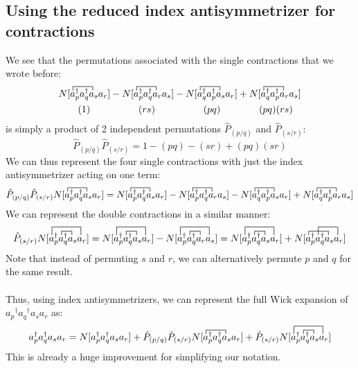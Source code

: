 \documentclass{article}
\newcommand{\fctr}{\contraction}
\newcommand{\dg}{\ensuremath{^\dagger} }
\begin{document}
 \subsection{Using the reduced index antisymmetrizer for contractions}
 We see that the permutations associated with the single contractions that we wrote before: 
 \begin{align*}
 & N[ \fctr{}{x}{{}_1a_q\dg }{x} a_p\dg  a_q\dg a_s a_r  ] - N[ \fctr{}{x}{{}_1a_q\dg  }{x} a_p\dg a_q\dg a_r  a_s  ] 
- N[ \fctr{ }{x}{{}_q\dg a_p\dg }{x} a_q\dg  a_p\dg a_s a_r  ] +  N[ \fctr{ }{x}{{}_q\dg a_p\dg }{x} a_q\dg a_p\dg  a_r a_s   ] \\ 
& \quad \quad (1)  \quad \quad  \quad \quad \quad (rs) \quad \quad  \quad \quad \quad (pq) \quad \quad  \quad \quad (pq)(rs) 
\end{align*}
is simply a product of 2 independent permutations $\hat{P}_{(p/q)}$ and $\hat{P}_{(s/r)}$:
\[ \hat{P}_{(p/q)}\hat{P}_{(s/r)} = 1 - (pq) - (sr) + (pq)(sr) \]
We can thus represent the four single contractions with just the index antisymmetrizer acting on one term: 
\[ \hat{P}_{(p/q)}\hat{P}_{(s/r)} N[ \fctr{}{x}{{}_1a_q\dg }{x} a_p\dg  a_q\dg a_s a_r  ]  = N[ \fctr{}{x}{{}_1a_q\dg }{x} a_p\dg  a_q\dg a_s a_r  ] - N[ \fctr{}{x}{{}_1a_q\dg  }{x} a_p\dg a_q\dg a_r  a_s  ] 
- N[ \fctr{ }{x}{{}_q\dg a_p\dg }{x} a_q\dg  a_p\dg a_s a_r  ] +  N[ \fctr{ }{x}{{}_q\dg a_p\dg }{x} a_q\dg a_p\dg  a_r a_s   ]  \] 
We can represent the double contractions in a similar manner: 
\[ \hat{P}_{(s/r)}  N[ \fctr{a_p\dg }{x}{{}_2}{x} \fctr[2ex]{}{x}{{}_1a_q\dg  a_s }{x}      a_p\dg a_q\dg a_s a_r  ]  =  N[ \fctr{a_p\dg }{x}{{}_2}{x} \fctr[2ex]{}{x}{{}_1a_q\dg  a_s }{x}      a_p\dg a_q\dg a_s a_r  ] 
 - N[ \fctr{a_p\dg }{x}{{}_2}{x} \fctr[2ex]{}{x}{{}_1a_q\dg  a_s }{x}      a_p\dg a_q\dg a_r a_s  ] = N[ \fctr{a_p\dg }{x}{{}_2}{x} \fctr[2ex]{}{x}{{}_1a_q\dg  a_s }{x}      a_p\dg a_q\dg a_s a_r  ] 
+ N[ \fctr{}{x}{{}_1a_q\dg }{x}  \fctr[2ex]{a_p\dg }{x}{{}_2 a_s }{x} a_p\dg a_q\dg a_s a_r  ] \]
Note that instead of permuting $s$ and $r$, we can alternatively permute $p$ and $q$ for the same result. 
\\ \\
Thus, using index antisymmetrizers, we can represent the full Wick expansion of $a_p\dg  a_q\dg a_s a_r $ as: 
\[a_p\dg  a_q\dg a_s a_r = N[a_p\dg  a_q\dg a_s a_r] + \hat{P}_{(p/q)}\hat{P}_{(s/r)} N[ \fctr{}{x}{{}_1a_q\dg }{x} a_p\dg  a_q\dg a_s a_r  ]  + \hat{P}_{(s/r)}  N[ \fctr{a_p\dg }{x}{{}_2}{x} \fctr[2ex]{}{x}{{}_1a_q\dg  a_s }{x}      a_p\dg a_q\dg a_s a_r  ]   \]
This is already a huge improvement for simplifying our notation. 
\end{document}
